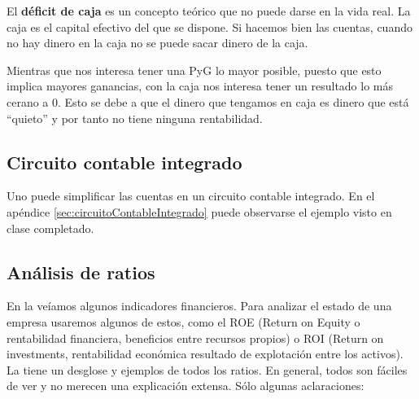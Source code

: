 \documentclass[nochap,palatino,shortheader]{apuntes}
\newcommand{\study}[1]{#1} \newcommand{\substudy}[1]{#1}
\begin{document}
El \textbf{\study{déficit de caja}} es un \substudy{concepto teórico que no puede darse en la vida real}.
La caja es el capital efectivo del que se dispone. Si hacemos bien las cuentas, cuando no hay dinero en la caja no se puede sacar dinero de la caja.

\obs Mientras que nos \study{interesa} tener una \study{PyG lo mayor posible}, puesto que esto implica mayores ganancias, con la \study{caja} nos interesa tener un resultado lo más \study{cerano a 0}.
Esto se debe a que el dinero que tengamos en caja es dinero que está ``quieto'' y por tanto no tiene ninguna rentabilidad.

\subsection{Circuito contable integrado}

Uno puede simplificar las cuentas en un circuito contable integrado. En el apéndice \ref{sec:circuitoContableIntegrado} puede observarse el ejemplo visto en clase completado.

\subsection{Análisis de ratios}

En la  veíamos algunos indicadores financieros. Para analizar el estado de una empresa usaremos algunos de estos, como el ROE (Return on Equity o rentabilidad financiera, beneficios entre recursos propios) o ROI (Return on investments, rentabilidad económica resultado de explotación entre los activos). La  tiene un desglose y ejemplos de todos los ratios. En general, todos son fáciles de ver y no merecen una explicación extensa. Sólo algunas aclaraciones:
\end{document}
